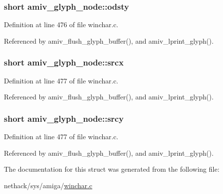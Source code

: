 \hypertarget{structamiv__glyph__node_ab1e73e6143c4515249068a242593f5bc}{
\subsubsection[{odsty}]{\setlength{\rightskip}{0pt plus 5cm}short amiv\+\_\+glyph\+\_\+node\+::odsty}}\label{structamiv__glyph__node_ab1e73e6143c4515249068a242593f5bc}


Definition at line 476 of file winchar.\+c.



Referenced by amiv\+\_\+flush\+\_\+glyph\+\_\+buffer(), and amiv\+\_\+lprint\+\_\+glyph().

\hypertarget{structamiv__glyph__node_af363a9798dc6d9c868059dea9aac6398}{
\subsubsection[{srcx}]{\setlength{\rightskip}{0pt plus 5cm}short amiv\+\_\+glyph\+\_\+node\+::srcx}}\label{structamiv__glyph__node_af363a9798dc6d9c868059dea9aac6398}


Definition at line 477 of file winchar.\+c.



Referenced by amiv\+\_\+flush\+\_\+glyph\+\_\+buffer(), and amiv\+\_\+lprint\+\_\+glyph().

\hypertarget{structamiv__glyph__node_a3c3e769de0818636664ba218715b9371}{
\subsubsection[{srcy}]{\setlength{\rightskip}{0pt plus 5cm}short amiv\+\_\+glyph\+\_\+node\+::srcy}}\label{structamiv__glyph__node_a3c3e769de0818636664ba218715b9371}


Definition at line 477 of file winchar.\+c.



Referenced by amiv\+\_\+flush\+\_\+glyph\+\_\+buffer(), and amiv\+\_\+lprint\+\_\+glyph().



The documentation for this struct was generated from the following file\+:\begin{DoxyCompactItemize}
\item 
nethack/sys/amiga/\hyperlink{winchar_8c}{winchar.\+c}\end{DoxyCompactItemize}
